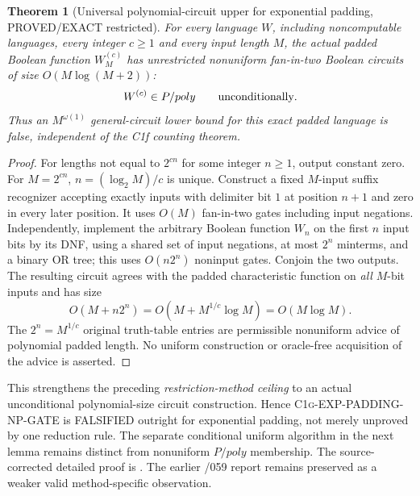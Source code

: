 \documentclass[11pt]{article}
\newtheorem{theorem}{Theorem}
\begin{document}
\begin{theorem}[Universal polynomial-circuit upper for exponential padding,
PROVED/EXACT restricted]
For every language $W$, including noncomputable languages, every
integer $c\ge1$ and every input length $M$, the actual padded Boolean
function $W^{(c)}_M$ has unrestricted nonuniform fan-in-two
Boolean circuits of size $O(M\log(M+2))$:
\[
W^{(c)}\in P/poly\qquad\hbox{unconditionally}.
\]
Thus an $M^{\omega(1)}$ general-circuit lower bound for this exact
padded language is false, independent of the C1f counting theorem.
\end{theorem}
\begin{proof}
For lengths not equal to $2^{cn}$ for some integer $n\ge1$, output
constant zero. For $M=2^{cn}$, $n=(\log_2M)/c$ is unique.
Construct a fixed $M$-input suffix recognizer accepting exactly
inputs with delimiter bit $1$ at position $n+1$ and zero in every
later position. It uses $O(M)$ fan-in-two gates including input
negations. Independently, implement the arbitrary Boolean function
$W_n$ on the first $n$ input bits by its DNF, using a shared set of
input negations, at most $2^n$ minterms, and a binary OR tree;
this uses $O(n2^n)$ noninput gates. Conjoin the two outputs.
The resulting circuit agrees with the padded characteristic
function on \emph{all} $M$-bit inputs and has size
\[
O(M+n2^n)=O(M+M^{1/c}\log M)=O(M\log M).
\]
The $2^n=M^{1/c}$ original truth-table entries are permissible
nonuniform advice of polynomial padded length. No uniform construction
or oracle-free acquisition of the advice is asserted.
\end{proof}
This strengthens the preceding \emph{restriction-method ceiling}
to an actual unconditional polynomial-size circuit construction.
Hence \textsc{C1g-EXP-PADDING-NP-GATE} is FALSIFIED outright
for exponential padding, not merely unproved by one reduction
rule. The separate conditional uniform algorithm in the next
lemma remains distinct from nonuniform $P/poly$ membership.
The source-corrected detailed proof is
.
The earlier /059 report remains preserved as a weaker valid
method-specific observation.
\end{document}
